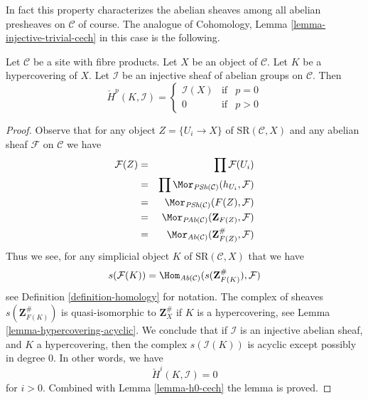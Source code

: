 \noindent
In fact this property characterizes the abelian sheaves among all
abelian presheaves on $\mathcal{C}$ of course.
The analogue of Cohomology, Lemma \ref{lemma-injective-trivial-cech}
in this case is the following.

\begin{lemma}
\label{lemma-injective-trivial-cech}
Let $\mathcal{C}$ be a site with fibre products.
Let $X$ be an object of $\mathcal{C}$.
Let $K$ be a hypercovering of $X$.
Let $\mathcal{I}$ be an injective sheaf of abelian groups on $\mathcal{C}$.
Then
$$
\check{H}^p(K, \mathcal{I}) =
\left\{
\begin{matrix}
\mathcal{I}(X) & \text{if} & p = 0 \\
0 & \text{if} & p > 0
\end{matrix}
\right.
$$
\end{lemma}

\begin{proof}
Observe that for any object $Z = \{U_i \to X\}$ of
$\text{SR}(\mathcal{C}, X)$ and any abelian sheaf
$\mathcal{F}$ on $\mathcal{C}$ we have
\begin{eqnarray*}
\mathcal{F}(Z)
& = &
\prod \mathcal{F}(U_i) \\
& = &
\prod \Mor_{\textit{PSh}(\mathcal{C})}(h_{U_i}, \mathcal{F})\\
& = &
\Mor_{\textit{PSh}(\mathcal{C})}(F(Z), \mathcal{F})\\
& = &
\Mor_{\textit{PAb}(\mathcal{C})}(\mathbf{Z}_{F(Z)}, \mathcal{F}) \\
& = &
\Mor_{\textit{Ab}(\mathcal{C})}(\mathbf{Z}_{F(Z)}^\#, \mathcal{F})
\end{eqnarray*}
Thus we see, for any simplicial object $K$ of
$\text{SR}(\mathcal{C}, X)$ that we have
\begin{equation}
\label{equation-identify-cech}
s(\mathcal{F}(K))
=
\Hom_{\textit{Ab}(\mathcal{C})}(s(\mathbf{Z}_{F(K)}^\#), \mathcal{F})
\end{equation}
see Definition \ref{definition-homology} for notation.
The complex of sheaves $s(\mathbf{Z}_{F(K)}^\#)$ is quasi-isomorphic
to $\mathbf{Z}_X^\#$ if $K$ is a hypercovering, see
Lemma \ref{lemma-hypercovering-acyclic}. We conclude
that if $\mathcal{I}$ is an injective abelian sheaf, and
$K$ a hypercovering, then the complex $s(\mathcal{I}(K))$
is acyclic except possibly in degree $0$.
In other words, we have
$$
\check{H}^i(K, \mathcal{I}) = 0
$$
for $i > 0$. Combined with Lemma \ref{lemma-h0-cech} the lemma is proved.
\end{proof}

